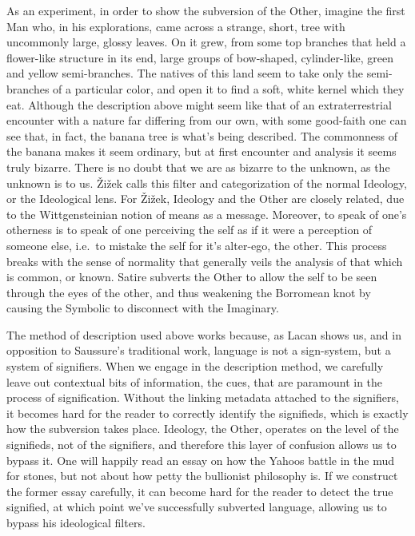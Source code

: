 \documentclass[11pt,letterpaper]{article}
\theoremstyle{definition}
\begin{document}
As an experiment, in order to show the subversion of the Other, imagine the first Man who, in his explorations, came across a strange, short, tree with uncommonly large, glossy leaves. On it grew, from some top branches that held a flower-like structure in its end, large groups of bow-shaped, cylinder-like, green and yellow semi-branches. The natives of this land seem to take only the semi-branches of a particular color, and open it to find a soft, white kernel which they eat. Although the description above might seem like that of an extraterrestrial encounter with a nature far differing from our own, with some good-faith one can see that, in fact, the banana tree is what's being described. The commonness of the banana makes it seem ordinary, but at first encounter and analysis it seems truly bizarre. There is no doubt that we are as bizarre to the unknown, as the unknown is to us. Žižek calls this filter and categorization of the normal Ideology, or the Ideological lens. For Žižek, Ideology and the Other are closely related, due to the Wittgensteinian notion of means as a message. Moreover, to speak of one's otherness is to speak of one perceiving the self as if it were a perception of someone else, i.e.\ to mistake the self for it's alter-ego, the other. This process breaks with the sense of normality that generally veils the analysis of that which is common, or known. Satire subverts the Other to allow the self to be seen through the eyes of the other, and thus weakening the Borromean knot by causing the Symbolic to disconnect with the Imaginary.

The method of description used above works because, as Lacan shows us, and in opposition to Saussure's traditional work, language is not a sign-system, but a system of signifiers. When  we engage in the description method, we carefully leave out contextual bits of information, the cues, that are paramount in the process of signification. Without the linking metadata attached to the signifiers, it becomes hard for the reader to correctly identify the signifieds, which is exactly how the subversion takes place. Ideology, the Other, operates on the level of the signifieds, not of the signifiers, and therefore this layer of confusion allows us to bypass it. One will happily read an essay on how the Yahoos battle in the mud for stones, but not about how petty the bullionist philosophy is. If we construct the former essay carefully, it can become hard for the reader to detect the true signified, at which point we've successfully subverted language, allowing us to bypass his ideological filters.
\end{document}
